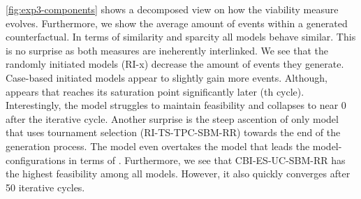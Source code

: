 \documentclass[./../../paper.tex]{subfiles}
\begin{document}
\autoref{fig:exp3-components} shows a decomposed view on how the viability measure evolves. Furthermore, we show the average amount of events within a generated counterfactual. 
In terms of similarity and sparcity all models behave similar. This is no surprise as both measures are ineherently interlinked. 
We see that the randomly initiated models (RI-x) decrease the amount of events they generate. 
Case-based initiated models appear to slightly gain more events. Although,   appears that reaches its saturation point significantly later (th cycle).
Interestingly, the  model struggles to maintain feasibility and collapses to near 0 after the  iterative cycle. 
Another surprise is the steep ascention of only model that uses tournament selection (RI-TS-TPC-SBM-RR) towards the end of the generation process. The  model even overtakes the model that leads the model-configurations in terms of . 
Furthermore, we see that {CBI-ES-UC-SBM-RR} has the highest feasibility among all models. However, it also quickly converges after 50 iterative cycles.    
   



\end{document}
